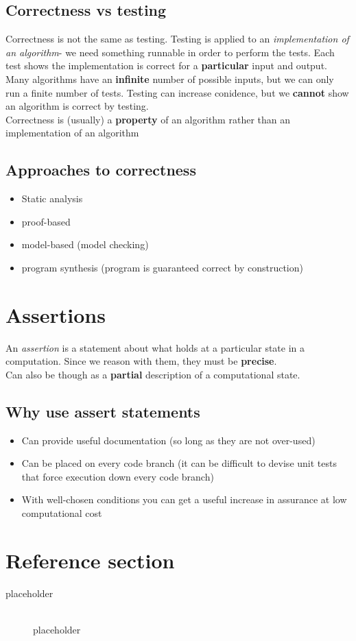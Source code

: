 \documentclass{article}
\begin{document}
\subsection{Correctness vs testing}
\begin{flushleft}
Correctness is not the same as testing. Testing is applied to an \textit{implementation of an algorithm}- we need something runnable in order to perform the tests. Each test shows the implementation is correct for a \textbf{particular} input and output. Many algorithms have an \textbf{infinite} number of possible inputs, but we can only run a finite number of tests. Testing can increase conidence, but we \textbf{cannot} show an algorithm is correct by testing.\\
Correctness is (usually) a \textbf{property} of an algorithm rather than an implementation of an algorithm
\end{flushleft}

\subsection{Approaches to correctness}
\begin{itemize}
	\item Static analysis
	\item proof-based
	\item model-based (model checking)
	\item program synthesis (program is guaranteed correct by construction)
\end{itemize}

\section{Assertions}
\begin{flushleft}
An \textit{assertion} is a statement about what holds at a particular state in a computation. Since we reason with them, they must be \textbf{precise}.\\
Can also be though as a \textbf{partial} description of a computational state.
\end{flushleft}

\subsection{Why use assert statements}
\begin{itemize}
	\item Can provide useful documentation (so long as they are not over-used)
	\item Can be placed on every code branch (it can be difficult to devise unit tests that force execution down every code branch)
	\item With well-chosen conditions you can get a useful increase in assurance at low computational cost
\end{itemize}

\pagebreak
\section*{Reference section} \label{sec:reference}
\begin{description}
	\item[placeholder] \hfill \\ placeholder
\end{description}
\end{document}
